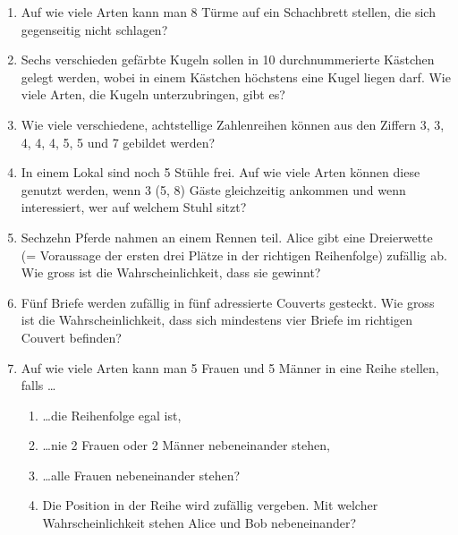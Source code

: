 \begin{ueb}
\begin{enumerate}
        \item Auf wie viele Arten kann man 8 Türme auf ein Schachbrett stellen, die sich gegenseitig nicht schlagen?
              \begin{center}
              \end{center}


        \item Sechs verschieden gefärbte Kugeln sollen in 10 durchnummerierte Kästchen gelegt werden, wobei in einem Kästchen höchstens eine Kugel liegen darf. Wie viele Arten, die Kugeln unterzubringen, gibt es?


        \item
              Wie viele verschiedene, achtstellige Zahlenreihen können aus den Ziffern 3, 3, 4, 4, 4, 5, 5 und 7 gebildet werden?



        \item In einem Lokal sind noch 5 Stühle frei. Auf wie viele Arten können diese genutzt werden, wenn 3 (5, 8) Gäste gleichzeitig ankommen und wenn interessiert, wer auf welchem Stuhl sitzt?




        \item Sechzehn Pferde nahmen an einem Rennen teil. Alice gibt eine Dreierwette (= Voraussage der ersten drei Plätze in der richtigen Reihenfolge) zufällig ab. Wie gross ist die Wahrscheinlichkeit, dass sie gewinnt?

        \item Fünf Briefe werden zufällig in fünf adressierte Couverts gesteckt. Wie gross ist die Wahrscheinlichkeit, dass sich mindestens vier Briefe im richtigen Couvert befinden?





        \item Auf wie viele Arten kann man 5 Frauen und 5 Männer in eine Reihe stellen, falls \dots
              \begin{enumerate}
                  \item \dots die Reihenfolge egal ist,
                  \item \dots nie 2 Frauen oder 2 Männer nebeneinander stehen,
                  \item \dots alle Frauen nebeneinander stehen?
                  \item Die Position in der Reihe wird zufällig vergeben. Mit welcher Wahrscheinlichkeit stehen Alice und Bob nebeneinander?
              \end{enumerate}


\end{enumerate}
\end{ueb}

